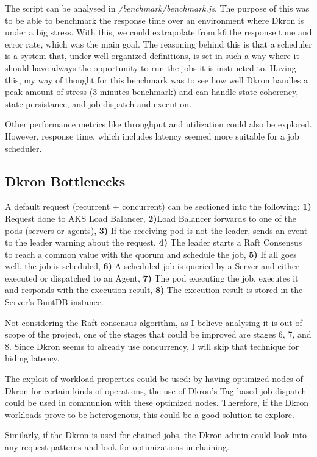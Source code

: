 \documentclass[runningheads]{llncs}
\begin{document}
The script can be analysed in \textit{/benchmark/benchmark.js}.
The purpose of this was to be able to benchmark the response time over an environment where Dkron
is under a big stress. With this, we could extrapolate from k6 the response time and error rate,
which was the main goal. The reasoning behind this is that a scheduler is a system that, under
well-organized definitions, is set in such a way where it should have always the opportunity to
run the jobs it is instructed to. Having this, my way of thought for this benchmark was to
see how well Dkron handles a peak amount of stress (3 minutes benchmark) and can handle
state coherency, state persistance, and job dispatch and execution.

Other performance metrics like throughput and utilization could also be explored.
However, response time, which includes latency seemed more suitable for a job scheduler.


\subsection{Dkron Bottlenecks}
A default request (recurrent + concurrent) can be sectioned into the following:
\textbf{1)} Request done to AKS Load Balancer,
\textbf{2)}Load Balancer forwards to one of the pods (servers or agents),
\textbf{3)} If the receiving pod is not the leader, sends an event to the leader warning about the request,
\textbf{4)} The leader starts a Raft Consensus to reach a common value with the quorum and schedule the job,
\textbf{5)} If all goes well, the job is scheduled,
\textbf{6)} A scheduled job is queried by a Server and either executed or dispatched to an Agent,
\textbf{7)} The pod executing the job, executes it and responds with the execution result,
\textbf{8)} The execution result is stored in the Server's BuntDB instance.

Not considering the Raft consensus algorithm, as I believe analysing it is out of scope of the project,
one of the stages that could be improved are stages 6, 7, and 8.
Since Dkron seems to already use concurrency, I will skip that technique for hiding latency.

The exploit of workload properties could be used: by having optimized nodes of Dkron for certain
kinds of operations, the use of Dkron's Tag-based job dispatch could be used in communion with these
optimized nodes. Therefore, if the Dkron workloads prove to be heterogenous, this could be a good
solution to explore.

Similarly, if the Dkron is used for chained jobs, the Dkron admin could look into any request patterns
and look for optimizations in chaining.
\end{document}
